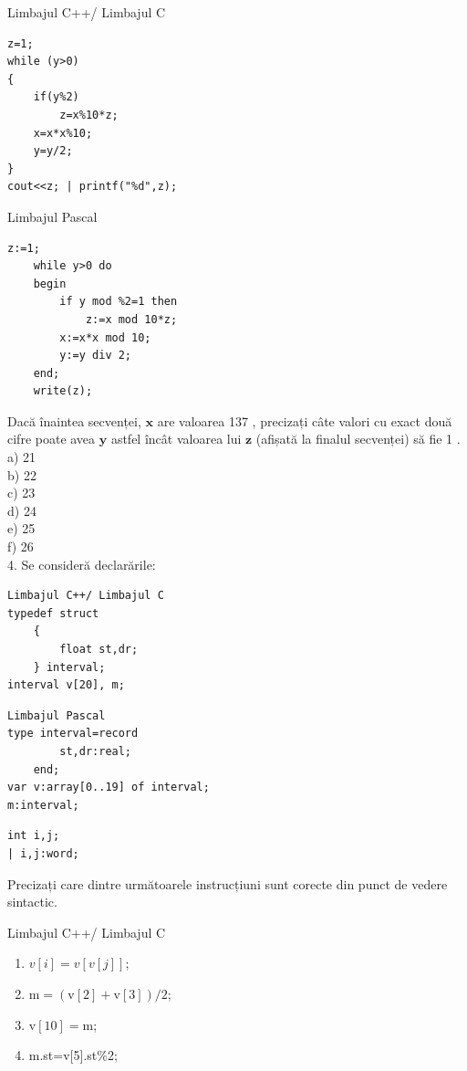 \documentclass[10pt]{article}
\begin{document}
Limbajul C++/ Limbajul C

\begin{verbatim}
z=1;
while (y>0)
{
    if(y%2)
        z=x%10*z;
    x=x*x%10;
    y=y/2;
}
cout<<z; | printf("%d",z);
\end{verbatim}

Limbajul Pascal

\begin{verbatim}
z:=1;
    while y>0 do
    begin
        if y mod %2=1 then
            z:=x mod 10*z;
        x:=x*x mod 10;
        y:=y div 2;
    end;
    write(z);
\end{verbatim}

Dacă înaintea secvenței, $\mathbf{x}$ are valoarea 137 , precizați câte valori cu exact două cifre poate avea $\mathbf{y}$ astfel încât valoarea lui $\mathbf{z}$ (afișată la finalul secvenței) să fie 1 .\\
a) 21\\
b) 22\\
c) 23\\
d) 24\\
e) 25\\
f) 26\\
4. Se consideră declarările:

\begin{verbatim}
Limbajul C++/ Limbajul C
typedef struct
    {
        float st,dr;
    } interval;
interval v[20], m;
\end{verbatim}

\begin{verbatim}
Limbajul Pascal
type interval=record
        st,dr:real;
    end;
var v:array[0..19] of interval;
m:interval;
\end{verbatim}

\begin{verbatim}
int i,j;
| i,j:word;
\end{verbatim}

Precizați care dintre următoarele instrucțiuni sunt corecte din punct de vedere sintactic.

Limbajul C++/ Limbajul C

\begin{enumerate}
  \item $v[i]=v[v[j]]$;
  \item $\mathrm{m}=(\mathrm{v}[2]+\mathrm{v}[3]) / 2$;
  \item $\mathrm{v}[10]=\mathrm{m}$;
  \item m.st=v[5].st\%2;
\end{enumerate}
\end{document}
